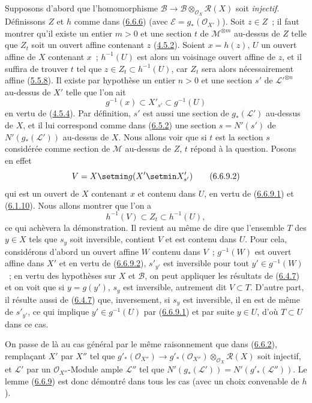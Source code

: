 Supposons d'abord que l'homomorphisme
$\mathcal{B}\to
\mathcal{B}\otimes_{\mathcal{O}_X}\mathcal{R}(X)$ soit \emph{injectif}.
Définissons $Z$ et $h$ comme dans (\hyperref[II.6.6.6-fr]{6.6.6}) (avec
$\mathcal{E}=g_*(\mathcal{O}_{X'})$). Soit $z\in Z$~; il faut montrer qu'il
existe un entier $m>0$ et une section $t$ de $\mathcal{M}^{\otimes m}$
au-dessus de $Z$ telle que $Z_t$ soit un ouvert affine contenant $z$
(\hyperref[II.4.5.2-fr]{4.5.2}). Soient $x=h(z)$, $U$ un ouvert affine de
$X$ contenant $x$~; $h^{-1}(U)$ est alors un voisinage ouvert affine de $z$,
et il suffira de trouver $t$ tel que $z\in Z_t\subset h^{-1}(U)$, car $Z_t$
sera alors nécessairement affine (\hyperref[II.5.5.8-fr]{5.5.8}). Il existe
par hypothèse un entier $n>0$ et une section $s'$ de
${\mathcal{L}'}^{\otimes n}$ au-dessus de $X'$ telle que l'on ait
\[
\label{II.6.6.9.1-fr}
g^{-1}(x)\subset X'_{s'}\subset g^{-1}(U)
\tag{6.6.9.1}
\]
en vertu de (\hyperref[II.4.5.4-fr]{4.5.4}). Par définition, $s'$ est aussi
une section de $g_*(\mathcal{L}')$ au-dessus de $X$, et il lui
correspond comme dans (\hyperref[II.6.5.2-fr]{6.5.2}) une section
$s=N'(s')$ de $N'(g_*(\mathcal{L}'))$ au-dessus
de $X$. Nous allons voir que si $t$ est la section $s$ considérée comme
section de $\mathcal{M}$ au-dessus de $Z$, $t$ répond à la
question. Posons en effet
\[
\label{II.6.6.9.2-fr}
V=X\setmin g(X'\setmin X'_{s'})
\tag{6.6.9.2}
\]
qui est un ouvert de $X$ contenant $x$ et contenu dans $U$, en vertu de
(\hyperref[II.6.6.9.1-fr]{6.6.9.1}) et
(\hyperref[II.6.1.10-fr]{6.1.10}). Nous allons montrer que l'on a
\[
\label{II.6.6.9.3-fr}
h^{-1}(V)\subset Z_t\subset h^{-1}(U),
\tag{6.6.9.3}
\]
ce qui achèvera la démonstration. Il revient au même de dire que l'ensemble
$T$ des $y\in X$ tels que $s_y$ soit inversible, contient $V$ et est contenu
dans $U$. Pour cela, considérons d'abord un ouvert affine $W$ contenu dans
$V$~; $g^{-1}(W)$ est ouvert affine dans $X'$ et en vertu de
(\hyperref[II.6.6.9.2-fr]{6.6.9.2}), $s'_{y'}$ est inversible pour tout
$y'\in g^{-1}(W)$~; en vertu des hypothèses sur $X$ et $\mathcal{B}$, on
peut appliquer les résultats de (\hyperref[II.6.4.7-fr]{6.4.7}) et on voit
que si $y=g(y')$, $s_y$ est inversible, autrement dit $V\subset T$. D'autre
part, il résulte aussi de (\hyperref[II.6.4.7-fr]{6.4.7}) que, inversement,
si $s_y$ est inversible, il en est de même de $s'_{y'}$, ce qui implique
$y'\in g^{-1}(U)$ par (\hyperref[II.6.6.9.1-fr]{6.6.9.1}) et par suite
$y\in U$, d'où $T\subset U$ dans ce cas.

On passe de là au cas général par le même raisonnement que dans
(\hyperref[II.6.6.2-fr]{6.6.2}), remplaçant $X'$ par $X''$ tel que
$g'_*(\mathcal{O}_{X''})\to
g'_*(\mathcal{O}_{X''})\otimes_{\mathcal{O}_X}\mathcal{R}(X)$
soit injectif, et $\mathcal{L}'$ par un $\mathcal{O}_{X''}$-Module ample
$\mathcal{L}''$ tel que
$N'(g_*(\mathcal{L}'))=N'(g'_*(\mathcal{L}''))$. Le lemme
(\hyperref[II.6.6.9-fr]{6.6.9}) est donc démontré dans tous les cas (avec un
choix convenable de $h$).

